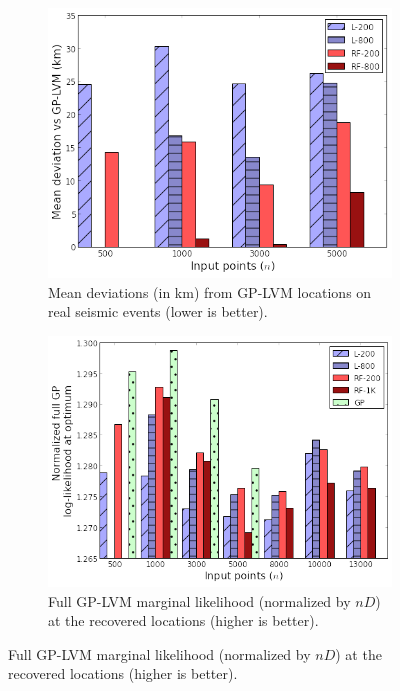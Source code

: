 \documentclass{article}
\begin{document}
\begin{figure}
\centering
\begin{subfigure}[t]{.45\textwidth}
 \includegraphics[width=\textwidth]{seismic_loc}
\caption{Mean deviations (in km) from GP-LVM locations on real seismic
  events (lower is better).}
\label{fig:seismicloc}
\end{subfigure}
\qquad
\begin{subfigure}[t]{.45\textwidth}
 \includegraphics[width=\textwidth]{seismic_lik}
\caption{Full GP-LVM marginal likelihood (normalized by $nD$) at the
  recovered locations (higher is better).}
\label{fig:seismiclik}
 \end{subfigure}
\end{figure}
\vspace{-1em}
\end{document}
